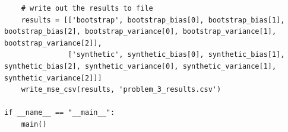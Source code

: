 \documentclass[12pt]{article}
\begin{document}
\begin{appendices}
\begin{lstlisting}
    # write out the results to file
    results = [['bootstrap', bootstrap_bias[0], bootstrap_bias[1], bootstrap_bias[2], bootstrap_variance[0], bootstrap_variance[1], bootstrap_variance[2]],
               ['synthetic', synthetic_bias[0], synthetic_bias[1], synthetic_bias[2], synthetic_variance[0], synthetic_variance[1], synthetic_variance[2]]]
    write_mse_csv(results, 'problem_3_results.csv')

if __name__ == "__main__":
    main()
\end{lstlisting}

\end{appendices}
\end{document}
